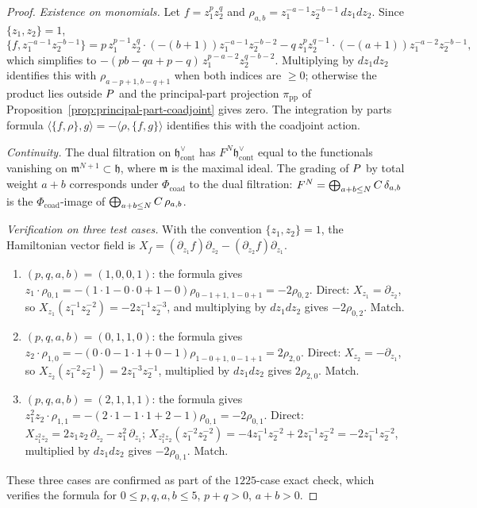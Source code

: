 \documentclass[11pt]{memoir}
\begin{document}
\begin{proof}
  \emph{Existence on monomials.} Let $f=z_1^pz_2^q$ and
  $\rho_{a,b}=z_1^{-a-1}z_2^{-b-1}\,dz_1dz_2$. Since $\{z_1,z_2\}=1$,
  $$\{f,z_1^{-a-1}z_2^{-b-1}\}
    =p\,z_1^{p-1}z_2^q\cdot(-(b+1))z_1^{-a-1}z_2^{-b-2}
    -q\,z_1^pz_2^{q-1}\cdot(-(a+1))z_1^{-a-2}z_2^{-b-1},$$
  which simplifies to $-(pb-qa+p-q)\,z_1^{p-a-2}z_2^{q-b-2}$. Multiplying
  by $dz_1dz_2$ identifies this with $\rho_{a-p+1,b-q+1}$ when both
  indices are $\ge0$; otherwise the product lies outside $P$ and the
  principal-part projection $\pi_{\mathrm{pp}}$ of
  Proposition~\ref{prop:principal-part-coadjoint} gives zero. The
  integration by parts formula
  $\langle\{f,\rho\},g\rangle=-\langle\rho,\{f,g\}\rangle$ identifies
  this with the coadjoint action.

  \emph{Continuity.} The dual filtration on
  $\mathfrak h^\vee_{\mathrm{cont}}$ has
  $F^N\mathfrak h^\vee_{\mathrm{cont}}$ equal to the functionals
  vanishing on $\mathfrak m^{N+1}\subset\mathfrak h$, where
  $\mathfrak m$ is the maximal ideal. The grading of $P$ by total
  weight $a+b$ corresponds under $\Phi_{\mathrm{coad}}$ to the dual
  filtration: $F^N=\bigoplus_{a+b\le N}C\,\delta_{a,b}$ is the
  $\Phi_{\mathrm{coad}}$-image of
  $\bigoplus_{a+b\le N}C\,\rho_{a,b}$.

  \emph{Verification on three test cases.} With the convention
  $\{z_1,z_2\}=1$, the Hamiltonian vector field is
  $X_f=(\partial_{z_1}f)\partial_{z_2}-(\partial_{z_2}f)\partial_{z_1}$.
  \begin{enumerate}
    \item $(p,q,a,b)=(1,0,0,1)$: the formula gives
      $z_1\cdot\rho_{0,1}=-(1\cdot1-0\cdot0+1-0)\rho_{0-1+1,\,1-0+1}=-2\rho_{0,2}$.
      Direct: $X_{z_1}=\partial_{z_2}$, so
      $X_{z_1}(z_1^{-1}z_2^{-2})=-2z_1^{-1}z_2^{-3}$, and multiplying by
      $dz_1dz_2$ gives $-2\rho_{0,2}$. Match.
    \item $(p,q,a,b)=(0,1,1,0)$: the formula gives
      $z_2\cdot\rho_{1,0}=-(0\cdot0-1\cdot1+0-1)\rho_{1-0+1,\,0-1+1}=2\rho_{2,0}$.
      Direct: $X_{z_2}=-\partial_{z_1}$, so
      $X_{z_2}(z_1^{-2}z_2^{-1})=2z_1^{-3}z_2^{-1}$, multiplied by
      $dz_1dz_2$ gives $2\rho_{2,0}$. Match.
    \item $(p,q,a,b)=(2,1,1,1)$: the formula gives
      $z_1^2z_2\cdot\rho_{1,1}=-(2\cdot1-1\cdot1+2-1)\rho_{0,1}=-2\rho_{0,1}$.
      Direct:
      $X_{z_1^2z_2}=2z_1z_2\,\partial_{z_2}-z_1^2\,\partial_{z_1}$;
      $X_{z_1^2z_2}(z_1^{-2}z_2^{-2})
       =-4z_1^{-1}z_2^{-2}+2z_1^{-1}z_2^{-2}
       =-2z_1^{-1}z_2^{-2}$, multiplied by $dz_1dz_2$ gives
      $-2\rho_{0,1}$. Match.
  \end{enumerate}
  These three cases are confirmed as part of the \(1225\)-case exact
  check, which verifies the formula for \(0\le p,q,a,b\le5\),
  \(p+q>0\), \(a+b>0\).


\end{proof}
\end{document}
